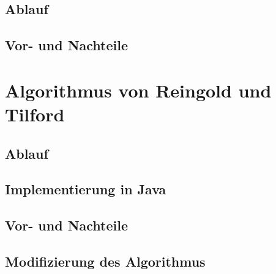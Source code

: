 \subsection{Ablauf}

\subsection{Vor- und Nachteile}

\section{Algorithmus von Reingold und Tilford}

\subsection{Ablauf}

\subsection{Implementierung in Java}

\subsection{Vor- und Nachteile}

\subsection{Modifizierung des Algorithmus}

